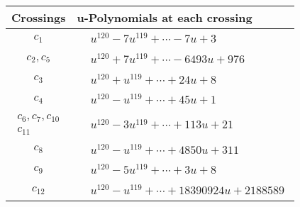 \documentclass[1p]{elsarticle_modified}
\theoremstyle{definition}
\begin{document}
\begin{tabular}{m{50pt}|m{274pt}}
Crossings & \hspace{64pt}u-Polynomials at each crossing \\
\hline $$\begin{aligned}c_{1}\end{aligned}$$&$\begin{aligned}
&u^{120}-7 u^{119}+\cdots-7 u+3
\end{aligned}$\\
\hline $$\begin{aligned}c_{2},c_{5}\end{aligned}$$&$\begin{aligned}
&u^{120}+7 u^{119}+\cdots-6493 u+976
\end{aligned}$\\
\hline $$\begin{aligned}c_{3}\end{aligned}$$&$\begin{aligned}
&u^{120}+u^{119}+\cdots+24 u+8
\end{aligned}$\\
\hline $$\begin{aligned}c_{4}\end{aligned}$$&$\begin{aligned}
&u^{120}- u^{119}+\cdots+45 u+1
\end{aligned}$\\
\hline $$\begin{aligned}c_{6},c_{7},c_{10}\\c_{11}\end{aligned}$$&$\begin{aligned}
&u^{120}-3 u^{119}+\cdots+113 u+21
\end{aligned}$\\
\hline $$\begin{aligned}c_{8}\end{aligned}$$&$\begin{aligned}
&u^{120}- u^{119}+\cdots+4850 u+311
\end{aligned}$\\
\hline $$\begin{aligned}c_{9}\end{aligned}$$&$\begin{aligned}
&u^{120}-5 u^{119}+\cdots+3 u+8
\end{aligned}$\\
\hline $$\begin{aligned}c_{12}\end{aligned}$$&$\begin{aligned}
&u^{120}- u^{119}+\cdots+18390924 u+2188589
\end{aligned}$\\
\hline
\end{tabular}\\~\\
\end{document}
